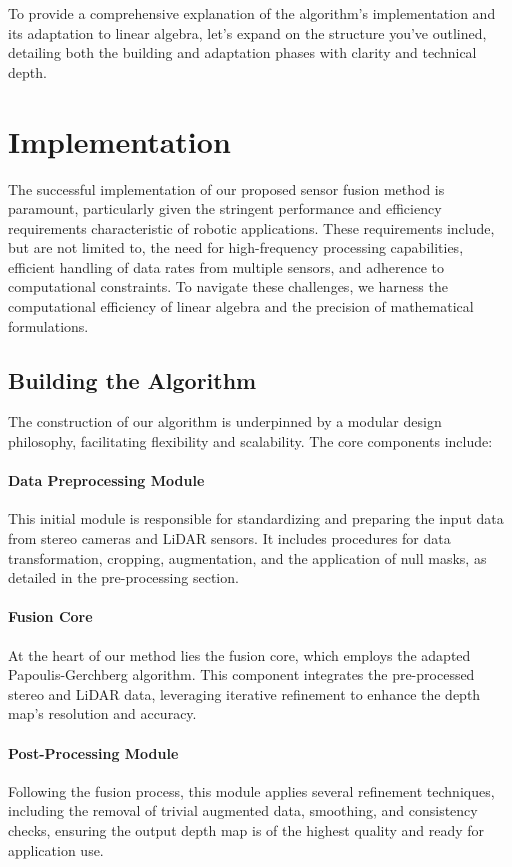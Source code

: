 \documentclass[conference]{IEEEtran}
\begin{document}
To provide a comprehensive explanation of the algorithm's implementation and its adaptation to linear algebra, let's expand on the structure you've outlined, detailing both the building and adaptation phases with clarity and technical depth.

\section{Implementation} \label{implementation}

The successful implementation of our proposed sensor fusion method is paramount, particularly given the stringent performance and efficiency requirements characteristic of robotic applications. These requirements include, but are not limited to, the need for high-frequency processing capabilities, efficient handling of data rates from multiple sensors, and adherence to computational constraints. To navigate these challenges, we harness the computational efficiency of linear algebra and the precision of mathematical formulations.

\subsection{Building the Algorithm}

The construction of our algorithm is underpinned by a modular design philosophy, facilitating flexibility and scalability. The core components include:

\paragraph{Data Preprocessing Module} 
This initial module is responsible for standardizing and preparing the input data from stereo cameras and LiDAR sensors. It includes procedures for data transformation, cropping, augmentation, and the application of null masks, as detailed in the pre-processing section.

\paragraph{Fusion Core}
At the heart of our method lies the fusion core, which employs the adapted Papoulis-Gerchberg algorithm. This component integrates the pre-processed stereo and LiDAR data, leveraging iterative refinement to enhance the depth map's resolution and accuracy.

\paragraph{Post-Processing Module}
Following the fusion process, this module applies several refinement techniques, including the removal of trivial augmented data, smoothing, and consistency checks, ensuring the output depth map is of the highest quality and ready for application use.
\end{document}
